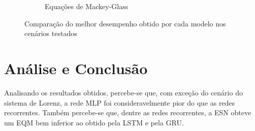 \documentclass{article}
\begin{document}
\begin{figure}[!ht]
\begin{subfigure}[t]{0.24\textwidth}
         \caption{Equações de Mackey-Glass}
     \end{subfigure}
     \centering     
     \caption{Comparação do melhor desempenho obtido por cada modelo nos cenários testados}
     \label{fig:model-comparison}
\end{figure}

\section{Análise e Conclusão}

Analisando os resultados obtidos, percebe-se que, com exceção do cenário do sistema de Lorenz, a rede MLP foi consideravelmente pior do que as redes recorrentes. Também percebe-se que, dentre as redes recorrentes, a ESN obteve um EQM bem inferior ao obtido pela LSTM e pela GRU.


{\footnotesize

}
\end{document}
